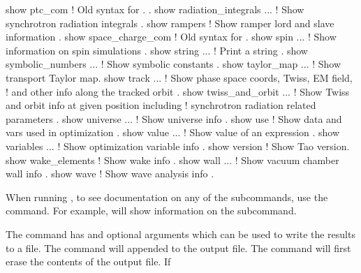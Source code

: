 {{{{{{{\begin{example}
  show ptc_com                 ! Old syntax for . .
  show radiation_integrals ... ! Show synchrotron radiation integrals .
  show rampers                 ! Show ramper lord and slave information .
  show space_charge_com        ! Old syntax for  .
  show spin ...                ! Show information on spin simulations .
  show string ...              ! Print a string .
  show symbolic_numbers ...    ! Show symbolic constants .
  show taylor_map ...          ! Show transport Taylor map.
  show track ...               ! Show phase space coords, Twiss, EM field, 
                               !   and other info along the tracked orbit .
  show twiss_and_orbit ...     ! Show Twiss and orbit info at given position including
                               !   synchrotron radiation related parameters .
  show universe ...            ! Show universe info .
  show use                     ! Show data and vars used in optimization .
  show value ...               ! Show value of an expression .
  show variables ...           ! Show optimization variable info .
  show version                 ! Show Tao version.
  show wake_elements           ! Show wake info .
  show wall ...                ! Show vacuum chamber wall info .
  show wave                    ! Show wave analysis info .
\end{example}

\vskip 10pt 

When running \tao, to see documentation on any of the subcommands, use the  command. For example,  will show information on the  subcommand.

The  command has  and  optional arguments which can be used to write
the results to a file.  The  command will appended to the output file. The  command will first erase the contents of the output file. If \vn{global%
\vn{*} character in it, a three digit number is substituted for the \vn{*}. The value of the number
starts at \vn{001} and increases by 1 each time \vn{show -write} is used.  Example:
\begin{example}
  show -write floor.dat lat -floor  ! Write floor positions to the file "floor.dat".
\end{example}

}}}}}}}}
